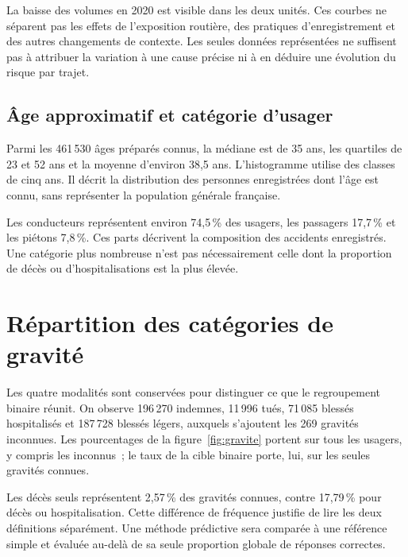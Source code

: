 La baisse des volumes en 2020 est visible dans les deux unités. Ces courbes ne séparent
pas les effets de l'exposition routière, des pratiques d'enregistrement et des autres
changements de contexte. Les seules données représentées ne suffisent pas à attribuer
la variation à une cause précise ni à en déduire une évolution du risque par trajet.
\FloatBarrier

\subsection{Âge approximatif et catégorie d'usager}
Parmi les 461\,530 âges préparés connus, la médiane est de 35 ans, les quartiles de
23 et 52 ans et la moyenne d'environ 38,5 ans. L'histogramme utilise des classes de
cinq ans. Il décrit la distribution des personnes enregistrées dont l'âge est connu,
sans représenter la population générale française.

Les conducteurs représentent environ 74,5\,\% des usagers, les passagers 17,7\,\% et
les piétons 7,8\,\%. Ces parts décrivent la composition des accidents enregistrés.
Une catégorie plus nombreuse n'est pas nécessairement celle dont la proportion de
décès ou d'hospitalisations est la plus élevée.
\FloatBarrier

\section{Répartition des catégories de gravité}
Les quatre modalités sont conservées pour distinguer ce que le regroupement binaire
réunit. On observe 196\,270 indemnes, 11\,996 tués, 71\,085 blessés hospitalisés et
187\,728 blessés légers, auxquels s'ajoutent les 269 gravités inconnues.
Les pourcentages de la figure~\ref{fig:gravite} portent sur tous les usagers, y compris
les inconnus~; le taux de la cible binaire porte, lui, sur les seules gravités connues.

Les décès seuls représentent 2,57\,\% des gravités connues, contre 17,79\,\% pour décès
ou hospitalisation. Cette différence de fréquence justifie de lire les deux définitions
séparément. Une méthode prédictive sera comparée à une référence simple et évaluée
au-delà de sa seule proportion globale de réponses correctes.
\FloatBarrier

